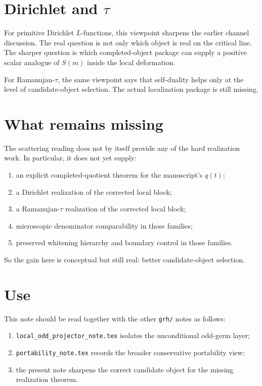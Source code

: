 \documentclass[11pt]{article}
\begin{document}
\section{Dirichlet and \texorpdfstring{$\tau$}{tau}}

For primitive Dirichlet \(L\)-functions, this viewpoint sharpens the earlier
channel discussion. The real question is not only which object is real on the
critical line. The sharper question is which completed-object package can supply
a positive scalar analogue of \(S(m)\) inside the local deformation.

For Ramanujan-\(\tau\), the same viewpoint says that self-duality helps only at
the level of candidate-object selection. The actual localization package is
still missing.

\section{What remains missing}

The scattering reading does not by itself provide any of the hard realization
work. In particular, it does not yet supply:

\begin{enumerate}
\item an explicit completed-quotient theorem for the manuscript's \(q(t)\);
\item a Dirichlet realization of the corrected local block;
\item a Ramanujan-\(\tau\) realization of the corrected local block;
\item microscopic denominator comparability in those families;
\item preserved whitening hierarchy and boundary control in those families.
\end{enumerate}

So the gain here is conceptual but still real: better candidate-object
selection.

\section{Use}

This note should be read together with the other \texttt{grh/} notes as follows:

\begin{enumerate}
\item \texttt{local_odd_projector_note.tex} isolates the unconditional odd-germ layer;
\item \texttt{portability_note.tex} records the broader conservative portability view;
\item the present note sharpens the correct candidate object for the missing
realization theorem.
\end{enumerate}
\end{document}
